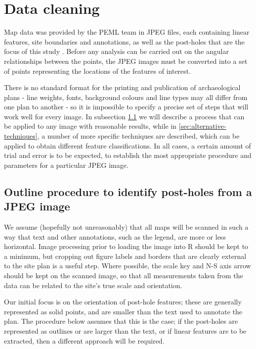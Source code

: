 \documentclass[../../ArchStats.tex]{subfiles}
\begin{document}
\section{Data cleaning}

Map data was provided by the PEML team in JPEG files, each containing linear features, site boundaries and annotations, as well as the post-holes that are the focus of this study . Before any analysis can be carried out on the angular relationships between the points, the JPEG images must be converted into a set of points representing the locations of the features of interest.

There is no standard format for the printing and publication of archaeological plans - line weights, fonts, background colours and line types may all differ from one plan to another - so it is impossible to specify a precise set of steps that will work well for every image. In subsection \ref{sec:points-to-JPEG} we will describe a process that can be applied to any image with reasonable results, while in \ref{sec:alternative-techniques}, a number of more specific techniques are described, which can be applied to obtain different feature classifications. In all cases, a certain amount of trial and error is to be expected, to establish the most appropriate procedure and parameters for a particular JPEG image. 

\subsection{Outline procedure to identify post-holes from a JPEG image}
\label{sec:points-to-JPEG}

We assume (hopefully not unreasonably) that all maps will be scanned in such a way that text and other annotations, such as the legend, are more or less horizontal. Image processing prior to loading the image into R should be kept to a minimum, but cropping out figure labels and borders that are clearly external to the site plan is a useful step. Where possible, the scale key and N-S axis arrow should be kept on the scanned image, so that all measurements taken from the data can be related to the site's true scale and orientation.

Our initial focus is on the orientation of post-hole features; these are generally represented as solid points, and are smaller than the text used to annotate the plan. The procedure below assumes that this is the case; if the post-holes are represented as outlines or are larger than the text, or if linear features are to be extracted, then a different approach will be required. 
\end{document}
